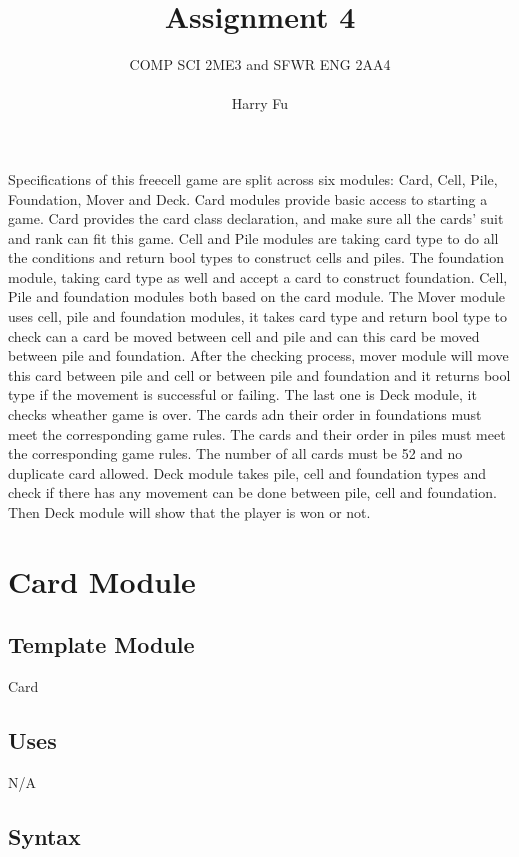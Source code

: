 \documentclass[12pt,fleqn]{article}
\title{Assignment 4}
\author{COMP SCI 2ME3 and SFWR ENG 2AA4\\\\Harry Fu}
\begin{document}
\maketitle

Specifications of this freecell game are split across six modules: Card, Cell, Pile, Foundation, Mover and Deck. Card modules provide basic access to starting a game. Card provides the card class declaration, and make sure all the cards' suit and rank can fit this game. Cell and Pile modules are taking card type to do all the conditions and return bool types to construct cells and piles. The foundation module, taking card type as well and accept a card to construct foundation. Cell, Pile and foundation modules both based on the card module. The Mover module uses cell, pile and foundation modules, it takes card type and return bool type to check can a card be moved between cell and pile and can this card be moved between pile and foundation. After the checking process, mover module will move this card between pile and cell or between pile and foundation and it returns bool type if the movement is successful or failing. The last one is Deck module, it checks wheather game is over. The cards adn their order in foundations must meet the corresponding game rules. The cards and their order in piles must meet the corresponding game rules. The number of all cards must be 52 and no duplicate card allowed. Deck module takes pile, cell and foundation types and check if there has any movement can be done between pile, cell and foundation. Then Deck module will show that the player is won or not. 

\section* {Card Module}

\subsection* {Template Module}

Card

\subsection* {Uses}

N/A

\subsection* {Syntax}
\end{document}
